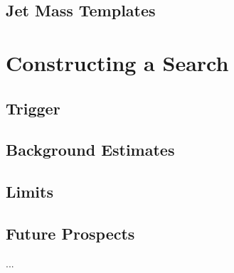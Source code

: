 \subsection{Jet Mass Templates}
	\label{chapter:search:substructure:templates}

\section{Constructing a Search}
\label{chapter:search:search}
	\subsection{Trigger}
	\subsection{Background Estimates}
	\subsection{Limits}
	\subsection{Future Prospects}
		...
